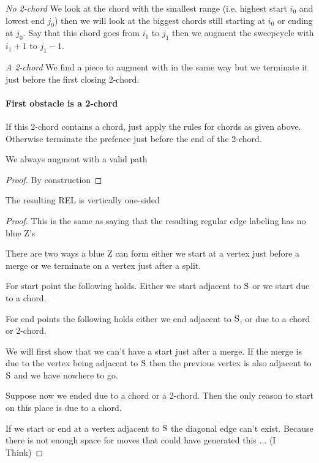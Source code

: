       \emph{No 2-chord}
      We look at the chord with the smallest range (i.e. highest start $i_0$ and lowest end $j_0$) then we will look at the biggest chords still starting at $i_0$ or ending at $j_0$. Say that this chord goes from $i_1$ to $j_1$ then we augment the sweepcycle with $i_1 +1$ to $j_1 -1$.

      \emph{A 2-chord}
      We find a piece to augment with in the same way  but we terminate it just before the first closing 2-chord.

      \paragraph{First obstacle is a 2-chord}
      If this 2-chord contains a chord, just apply the rules for chords as given above. Otherwise terminate the prefence just before the end of the 2-chord.


    \begin{lemma}
      \label{lm:}
      We always augment with a valid path
    \end{lemma}
    \begin{proof}
      By construction
    \end{proof}

    \begin{lemma}
      \label{lm:}
      The resulting REL is vertically one-sided
    \end{lemma}
    \begin{proof}
      This is the same as saying that the resulting regular edge labeling has no blue Z's

      There are two ways a blue Z can form either we start at a vertex just before a merge or we terminate on a vertex just after a split.

      For start point the following holds. Either we start adjacent to $\mathrm{S}$ or we start due to a chord.

      For end points the following holds either we end adjacent to $\mathrm{S}$, or due to a chord or 2-chord.


      We will first show that we can't have a start just after a merge.
      If the merge is due to the vertex being adjacent to $\mathrm{S}$ then the previous vertex is also adjacent to $\mathrm{S}$ and we have nowhere to go. 

      Suppose now we ended due to a chord or a 2-chord. Then the only reason to start on this place is due to a chord.

      If we start or end at a vertex adjacent to $\mathrm{S}$ the diagonal edge can't exist. Because there is not enough space for moves that could have generated this ... (I Think)



    \end{proof}


